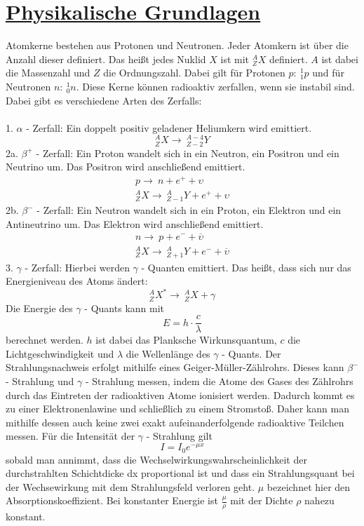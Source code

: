 \documentclass[11pt,a4paper]{article}
\begin{document}
\section{\underline{Physikalische Grundlagen}}
Atomkerne bestehen aus Protonen und Neutronen. Jeder Atomkern ist über die Anzahl
dieser definiert. Das heißt jedes Nuklid $X$ ist mit $^A_ZX$ definiert. $A$ ist dabei
die Massenzahl und $Z$ die Ordnungszahl. Dabei gilt für Protonen $p:~ ^1_1p$ und für
Neutronen $n:~ ^1_0n$. Diese Kerne können radioaktiv zerfallen, wenn sie instabil
sind. Dabei gibt es verschiedene Arten des Zerfalls:
\\\\
1. $\alpha$ - Zerfall: Ein doppelt positiv geladener Heliumkern wird emittiert.
\begin{equation}
  ^A_ZX \rightarrow ~ ^{A-4}_{Z-2}Y
\end{equation}
2a. $\beta ^+$ - Zerfall: Ein Proton wandelt sich in ein Neutron, ein Positron und ein
Neutrino um. Das Positron wird anschließend emittiert.
\begin{align}
  p \rightarrow ~ n + e^+ + \upsilon \\
  ^A_ZX \rightarrow ~ ^A_{Z-1}Y + e^+ + \upsilon
\end{align}
2b. $\beta ^-$ - Zerfall: Ein Neutron wandelt sich in ein Proton, ein Elektron und ein
Antineutrino um. Das Elektron wird anschließend emittiert.
\begin{align}
  n \rightarrow ~ p + e^- + \overline{\upsilon} \\
  ^A_ZX \rightarrow ~ ^A_{Z+1}Y + e^- + \overline{\upsilon}
\end{align}
3. $\gamma$ - Zerfall: Hierbei werden $\gamma$ - Quanten emittiert. Das heißt, dass sich nur das Energieniveau des Atoms ändert:
\begin{equation}
  ^A_ZX^* \rightarrow ~ ^A_ZX + \gamma
\end{equation}
Die Energie des $\gamma$ - Quants kann mit
\begin{equation}
  E = h \cdot \frac{c}{\lambda}
\end{equation}
berechnet werden. $h$ ist dabei das Planksche Wirkunsquantum, $c$ die
Lichtgeschwindigkeit und $\lambda$ die Wellenlänge des $\gamma$ - Quants.
Der Strahlungsnachweis erfolgt mithilfe eines Geiger-Müller-Zählrohrs. Dieses kann
$\beta^-$ - Strahlung und $\gamma$ - Strahlung messen, indem die Atome des Gases des
Zählrohrs durch das Eintreten der radioaktiven Atome ionisiert werden. Dadurch kommt
es zu einer Elektronenlawine und schließlich zu einem Stromstoß. Daher kann man
mithilfe dessen auch keine zwei exakt aufeinanderfolgende radioaktive Teilchen messen.
Für die Intensität der $\gamma$ - Strahlung gilt
\begin{equation}
  I = I_0e^{- \mu x}
\end{equation}
sobald man annimmt, dass die Wechselwirkungswahrscheinlichkeit der durchstrahlten
Schichtdicke dx proportional ist und dass ein Strahlungsquant bei der Wechsewirkung
mit dem Strahlungsfeld verloren geht. $\mu$ bezeichnet hier den
Absorptionskoeffizient. Bei konstanter Energie ist $\frac{\mu}{\rho}$ mit der Dichte
$\rho$ nahezu konstant.
\end{document}
